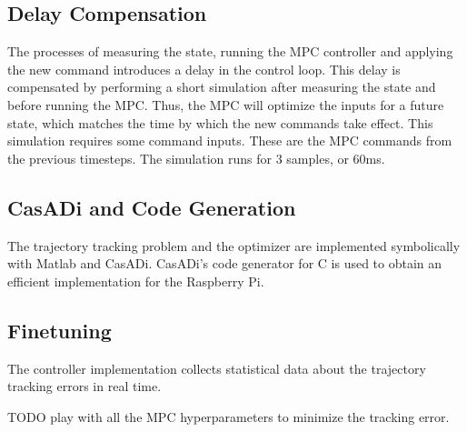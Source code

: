 \documentclass[12pt]{article}
\begin{document}
\subsection{Delay Compensation}

The processes of measuring the state, running the MPC controller and applying the new command introduces a delay in the control loop. This delay is compensated by performing a short simulation after measuring the state and before running the MPC. Thus, the MPC will optimize the inputs for a future state, which matches the time by which the new commands take effect.
This simulation requires some command inputs. These are the MPC commands from the previous timesteps.
The simulation runs for 3 samples, or 60ms.


\subsection{CasADi and Code Generation}

The trajectory tracking problem and the optimizer are implemented symbolically with Matlab and CasADi.
CasADi's code generator for C is used to obtain an efficient implementation for the Raspberry Pi.

\subsection{Finetuning}

The controller implementation collects statistical data about the trajectory tracking errors in real time.

TODO play with all the MPC hyperparameters to minimize the tracking error.
\end{document}
